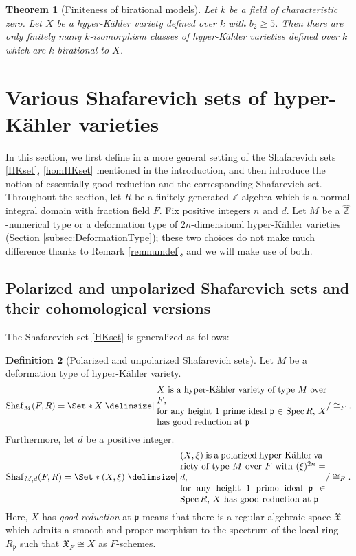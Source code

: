 \documentclass[11pt,reqno,oneside]{amsart}
\numberwithin{equation}{section}
\newtheorem{theorem}{Theorem}[section]
\theoremstyle{definition}
\newtheorem{definition}[theorem]{Definition}
\DeclareMathOperator{\Spec}{Spec}
\newcommand{\Sha}{\mathrm{Shaf}}
\newcommand{\ZZ}{\mathbb{Z}}
\newcommand{\fX}{\mathfrak{X}}
\begin{document}
\begin{theorem}[Finiteness of birational models]\label{cor:bir-fin}
Let $k$ be a field of characteristic zero. Let $X$ be a hyper-Kähler variety defined over $k$ with $b_2\geq 5$. 
Then there are only finitely many $k$-isomorphism classes of hyper-Kähler varieties defined over $k$ which are $k$-birational to $X$.
\end{theorem}






\section{Various Shafarevich sets of hyper-Kähler varieties} 
\label{sec:ShafarevichSets}

In this section, we first define in a more general setting of the Shafarevich sets \eqref{HKset}, \eqref{homHKset} mentioned in the introduction, and then introduce the notion of essentially good reduction and the corresponding Shafarevich set. Throughout the section, let $R$ be a finitely generated $\ZZ$-algebra which is a normal integral domain with fraction field $F$. Fix positive integers $n$ and $d$. Let $M$ be a $\widehat{\ZZ}$-numerical type or a deformation type of $2n$-dimensional hyper-Kähler varieties (Section \ref{subsec:DeformationType}); these two choices do not make much difference thanks to Remark \ref{remnumdef}, and we will make use of both.

\subsection{Polarized and unpolarized Shafarevich sets and their cohomological versions}
The Shafarevich set \eqref{HKset} is generalized as follows:
\begin{definition}[Polarized and unpolarized Shafarevich sets]\label{def:ShafaSets}
Let $M$ be a deformation type of hyper-Kähler variety. 
\begin{equation}\label{unpolHKset}
\Sha_{M}(F,R)=\Set*{X\given 
\parbox{19em}{
$X$ is a hyper-Kähler variety of type $M$ over $F$, \\
 for any height $1$ prime ideal $\mathfrak{p}\in \Spec R$, $X$ has good reduction at $\mathfrak{p}$
}
}/ \cong_{F}.
\end{equation}
Furthermore, let $d$ be a positive integer.
\begin{equation*}
\Sha_{M,d}(F,R)=\Set*{ (X, \xi) \given \parbox{16em}{
$(X, \xi)$ is a polarized hyper-Kähler variety of type $M$ over $F$ with $(\xi)^{2n}=d$, \\
for any height $1$ prime ideal $\mathfrak{p}\in \Spec R$, 
 $X$ has good reduction at $\mathfrak{p}$
}
}/ \cong_{F}.
\end{equation*}
Here, $X$ has \textit{good reduction} at $\mathfrak{p}$ means that there is a regular algebraic space $\fX$ which admits a smooth and proper morphism to the spectrum of the local ring $R_{\mathfrak{p}}$ such that $\fX_{F} \cong X$ as $F$-schemes.
\end{definition}
\end{document}
